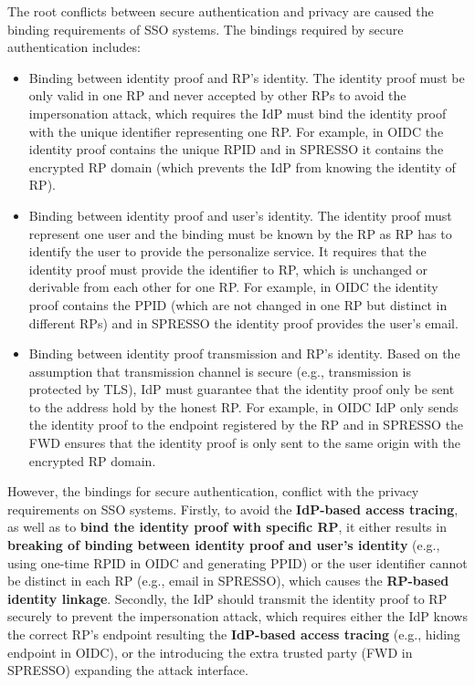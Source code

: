 {\color{red} The root conflicts between secure authentication and privacy are caused the binding requirements of SSO systems. The bindings required by secure authentication includes: 
\begin{itemize}
\item Binding between identity proof and RP's identity. The identity proof must be only valid in one RP and never accepted by other RPs to avoid the impersonation attack, which requires the IdP must bind the identity proof with the unique identifier representing one RP. For example, in OIDC the identity proof contains the unique RPID and in SPRESSO it contains the encrypted RP domain (which prevents the IdP from knowing the identity of RP).
\item Binding between identity proof and user's identity. The identity proof must represent one user and the binding must be known by the RP as RP has to identify the user to provide the personalize service. It requires that the identity proof must provide the identifier to RP, which is unchanged or derivable from each other for one RP. For example, in OIDC the identity proof contains the PPID (which are not changed in one RP but distinct in different RPs) and in SPRESSO the identity proof provides the user's email. 
\item Binding between identity proof transmission and RP's identity. Based on the assumption that transmission channel is secure (e.g., transmission is protected by TLS), IdP must guarantee that the identity proof only be sent to the address hold by the honest RP. For example, in OIDC IdP only sends the identity proof to the endpoint registered by the RP and in SPRESSO the FWD ensures that the identity proof is only sent to the same origin with the encrypted RP domain. 
\end{itemize} 
However, the bindings for secure authentication, conflict with the privacy requirements on SSO systems. Firstly, to avoid the \textbf{IdP-based access tracing}, as well as to \textbf{bind the identity proof with specific RP}, it either results in \textbf{breaking of binding between identity proof and user's identity} (e.g., using one-time RPID in OIDC and generating PPID) or the user identifier cannot be distinct in each RP (e.g., email in SPRESSO), which causes the \textbf{RP-based identity linkage}. Secondly, the IdP should transmit the identity proof to RP securely to prevent the impersonation attack, which requires either the IdP knows the correct RP's endpoint resulting the \textbf{IdP-based access tracing} (e.g., hiding endpoint in OIDC), or the introducing the extra trusted party (FWD in SPRESSO) expanding the attack interface.

 }

